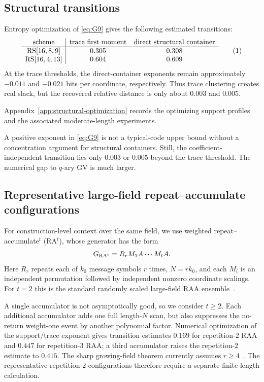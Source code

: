 \documentclass[runningheads,envcountsame,envcountsect]{llncs}
\newcommand{\eqnumlabel}[1]{%
  \refstepcounter{equation}\tag{\theequation}\label{#1}%
}
\begin{document}
\subsection{Structural transitions}

Entropy optimization of \eqref{eq:G9} gives the following estimated transitions:
\[
\begin{array}{c|cc}
\text{scheme} & \text{trace first moment} & \text{direct structural container}\\
\hline
\operatorname{RS}[16,8,9] & 0.305 & 0.308\\
\operatorname{RS}[16,4,13] & 0.604 & 0.609
\end{array}
\eqnumlabel{eq:G10}
\]
At the trace thresholds, the direct-container exponents remain approximately
$-0.011$ and $-0.021$ bits per coordinate, respectively.  Thus trace
clustering creates real slack, but the recovered relative distance is only
about $0.003$ and $0.005$.

Appendix~\ref{app:structural-optimization} records the optimizing support
profiles and the associated moderate-length experiments.

A positive exponent in \eqref{eq:G9} is not a typical-code upper bound without a
concentration argument for structural containers.  Still, the
coefficient-independent transition lies only $0.003$ or $0.005$ beyond the
trace threshold.  The numerical gap to $q$-ary GV is much larger.

\subsection{Representative large-field repeat--accumulate configurations}
\label{sec:raa-match}

For construction-level context over the same field, we use weighted
repeat--accumulate$^t$ (RA$^t$), whose generator has the form
\[
    G_{\rm RA^t}=R_r M_1 A \cdots M_t A.
\]
Here $R_r$ repeats each of $k_0$ message symbols $r$ times,
$N=rk_0$, and each $M_i$ is an independent permutation followed by independent
nonzero coordinate scalings.  For $t=2$ this is the standard randomly scaled
large-field RAA ensemble~\cite{rosnes11,akhiani26,khabbazian26}.

A single accumulator is not asymptotically good, so we consider $t\ge2$.  Each
additional accumulator adds one full length-$N$ scan, but also suppresses the
no-return weight-one event by another polynomial factor.  Numerical optimization
of the support/trace exponent gives transition estimates $0.169$ for
repetition-$2$ RAA and $0.447$ for repetition-$3$ RAA; a third accumulator
raises the repetition-$2$ estimate to $0.415$.  The sharp growing-field theorem
 currently assumes $r\ge4$~\cite{khabbazian26}.  The representative repetition-$2$
 configurations therefore require a separate finite-length calculation.
\end{document}
